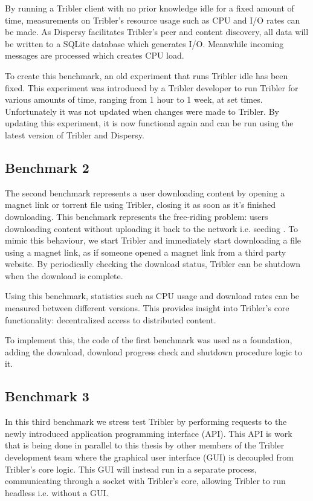 By running a Tribler client with no prior knowledge idle for a fixed amount of time, measurements on Tribler's resource usage such as CPU and I/O rates can be made.
As Dispersy facilitates Tribler's peer and content discovery, all data will be written to a SQLite database which generates I/O.
Meanwhile incoming messages are processed which creates CPU load.

To create this benchmark, an old experiment that runs Tribler idle has been fixed.
This experiment was introduced by a Tribler developer to run Tribler for various amounts of time, ranging from 1 hour to 1 week, at set times.
Unfortunately it was not updated when changes were made to Tribler.
By updating this experiment, it is now functional again and can be run using the latest version of Tribler and Dispersy.

\subsection{Benchmark 2}

The second benchmark represents a user downloading content by opening a magnet link or torrent file using Tribler, closing it as soon as it's finished downloading.
This benchmark represents the free-riding problem: users downloading content without uploading it back to the network i.e. seeding \cite{adar2000free}.
To mimic this behaviour, we start Tribler and immediately start downloading a file using a magnet link, as if someone opened a magnet link from a third party website.
By periodically checking the download status, Tribler can be shutdown when the download is complete.

Using this benchmark, statistics such as CPU usage and download rates can be measured between different versions.
This provides insight into Tribler's core functionality: decentralized access to distributed content.

To implement this, the code of the first benchmark was used as a foundation, adding the download, download progress check and shutdown procedure logic to it.

\subsection{Benchmark 3}
\label{ssct:benchmark_3}

In this third benchmark we stress test Tribler by performing requests to the newly introduced application programming interface (API).
This API is work that is being done in parallel to this thesis by other members of the Tribler development team where the graphical user interface (GUI) is decoupled from Tribler's core logic.
This GUI will instead run in a separate process, communicating through a socket with Tribler's core, allowing Tribler to run headless i.e. without a GUI.

